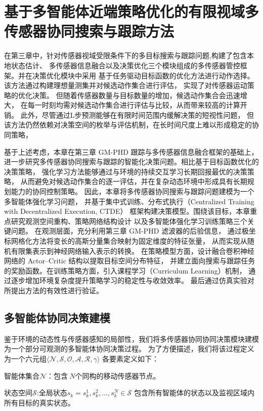 \chapter{基于多智能体近端策略优化的有限视域多传感器协同搜索与跟踪方法}

在第三章中，针对传感器视域受限条件下的多目标搜索与跟踪问题,构建了包含本地状态估计、
多传感器信息融合以及决策优化三个模块组成的多传感器管控框架。并在决策优化模块中采用
基于任务驱动目标函数的优化方法进行动作选择。该方法通过构建理想量测集并对候选动作集合进行评估，
实现了对传感器运动策略的优化决策。
但随着传感器数量与目标数量的增加，候选动作集合会迅速增大，
在每一时刻均需对候选动作集合进行评估与比较，从而带来较高的计算开销。
此外，尽管通过L步预测能够在有限时间范围内缓解决策的短视性问题，
但该方法仍然依赖对决策空间的枚举与评估机制，在长时间尺度上难以形成稳定的协同策略，

基于上述考虑，本章在第三章 GM-PHD 跟踪与多传感器信息融合框架的基础上，
进一步研究多传感器协同搜索与跟踪的智能化决策问题。相比基于目标函数优化的决策策略，
强化学习方法能够通过与环境的持续交互学习长期回报最优的决策策略，
从而避免对候选动作集合的逐一评估，并在复杂动态环境中形成具有长期规划能力的协同控制策略。
因此，本章将多传感器协同搜索与跟踪问题建模为一个多智能体强化学习问题，
并基于集中式训练、分布式执行（Centralized Training with Decentralized Execution, CTDE）
框架构建决策模型。围绕该目标，本章重点研究观测空间重构、策略网络结构设计
以及多智能体强化学习训练策略三个关键问题。
在观测层面，充分利用第三章 GM-PHD 滤波器的后验信息，
通过极坐标网格化方法将变长的高斯分量集合映射为固定维度的特征张量，
从而实现从随机有限集表示到神经网络输入表示的转换。
在策略模型方面，设计融合卷积神经网络的 Actor–Critic 结构以提取目标空间分布特征，
并建立面向搜索与跟踪任务的奖励函数。在训练策略方面，引入课程学习（Curriculum Learning）机制，
通过逐步增加环境复杂度提升策略学习的稳定性与收敛效率。
最后通过仿真实验对所提出方法的有效性进行验证。

\section{多智能体协同决策建模}
鉴于环境的动态性与传感器感知的局部性，我们将多传感器协同协同决策模块建模为一个部分可观测的多智能体协同决策过程。
为了方便描述，我们将该过程定义为一个六元组$\langle\mathcal{N},\mathcal{S},\mathcal{O},\mathcal{A},\mathcal{R},\gamma\rangle$
各要素定义如下：

智能体集合$\mathcal{N}$：包含$\ N$个同构的移动传感器节点。

状态空间$\mathcal{S}$:全局状态$s_{k}={s_{k}^{1},s_{k}^{2},\ldots,s_{k}^{N}}\in\mathcal{S}$
包含所有智能体的状态以及监视区域内所有目标的真实状态。

